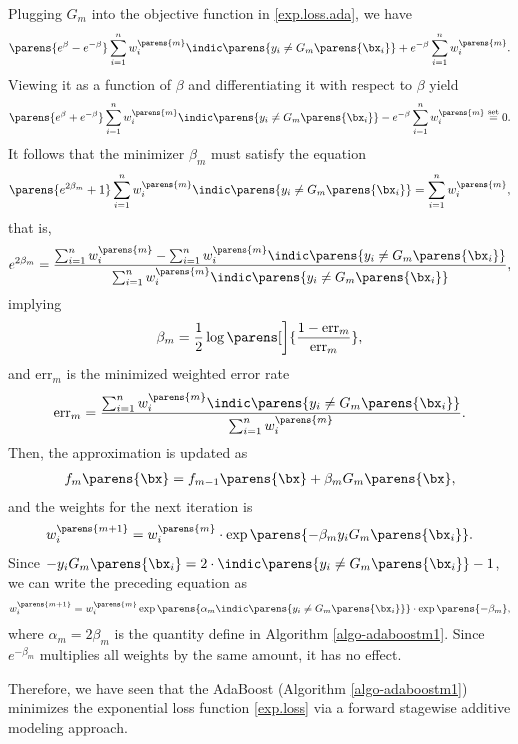 \documentclass[12pt]{article}
\begin{document}
\begin{enumerate}[label=\textbf{\arabic*.}]
	Plugging $G_m$ into the objective function in  \eqref{exp.loss.ada}, we have
	\begin{align*}
		\parens{e^{\beta} - e^{-\beta}} \sum_{i = 1}^n w_i^{\parens{m}} \indic \parens{y_i \ne G_m \parens{\bx_i}} + e^{-\beta} \sum_{i = 1}^n w_i^{\parens{m}}. 
	\end{align*}
	Viewing it as a function of $\beta$ and differentiating it with respect to $\beta$ yield 
	\begin{align*}
		\parens{e^{\beta} + e^{-\beta}} \sum_{i = 1}^n w_i^{\parens{m}} \indic \parens{y_i \ne G_m \parens{\bx_i}} - e^{-\beta} \sum_{i = 1}^n w_i^{\parens{m}} \stackrel{\text{set}}{=} 0. 
	\end{align*}
	It follows that the minimizer $\beta_m$ must satisfy the equation 
	\begin{align*}
		\parens{e^{2 \beta_m} + 1} \sum_{i = 1}^n w_i^{\parens{m}} \indic \parens{y_i \ne G_m \parens{\bx_i}} = \sum_{i = 1}^n w_i^{\parens{m}}, 
	\end{align*}
	that is, 
	\begin{align*}
		e^{2 \beta_m} = \frac{\sum_{i = 1}^n w_i^{\parens{m}} - \sum_{i = 1}^n w_i^{\parens{m}} \indic \parens{y_i \ne G_m \parens{\bx_i}}}{\sum_{i = 1}^n w_i^{\parens{m}} \indic \parens{y_i \ne G_m \parens{\bx_i}}}, 
	\end{align*}
	implying
	\begin{align*}
		\beta_m = \frac{1}{2} \log \parens[\bigg]{\frac{1 - \text{err}_m}{\text{err}_m}}, 
	\end{align*}
	and $\text{err}_m$ is the minimized weighted error rate
	\begin{align*}
		\text{err}_m = \frac{\sum_{i=1}^n w_i^{\parens{m}} \indic \parens{y_i \ne G_m \parens{\bx_i}}}{\sum_{i=1}^n w_i^{\parens{m}} }. 
	\end{align*}
	Then, the approximation is updated as 
	\begin{align*}
		f_m \parens{\bx} = f_{m-1} \parens{\bx} + \beta_m G_m \parens{\bx}, 
	\end{align*}
	and the weights for the next iteration is 
	\begin{align*}
		w^{\parens{m+1}}_i = w^{\parens{m}}_i \cdot \exp \parens{- \beta_m y_i G_m \parens{\bx_i}}. 
	\end{align*}
	Since $-y_i G_m \parens{\bx_i} = 2 \cdot \indic \parens{y_i \ne G_m \parens{\bx_i}} - 1$, we can write the preceding equation as 
	\begin{align*}
		w^{\parens{m+1}}_i = w^{\parens{m}}_i \exp \parens{\alpha_m \indic \parens{y_i \ne G_m \parens{\bx_i}}} \cdot \exp \parens{-\beta_m}, 
	\end{align*}
	where $\alpha_m = 2 \beta_m$ is the quantity define in Algorithm \ref{algo-adaboostm1}. Since $e^{-\beta_m}$ multiplies all weights by the same amount, it has no effect. 
	
	Therefore, we have seen that the AdaBoost (Algorithm \ref{algo-adaboostm1}) minimizes the exponential loss function \eqref{exp.loss} via a forward stagewise additive modeling approach. 

\end{enumerate}
\end{document}
